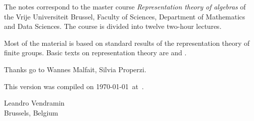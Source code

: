 \preface

The notes correspond to the master  
course \emph{Representation theory of algebras} of the 
Vrije Universiteit Brussel, 
Faculty of Sciences, 
Department of Mathematics and Data Sciences. The course
is divided into twelve two-hour lectures. 

Most of the material is based on standard 
results of the representation theory of finite groups. 
Basic texts on representation theory are \cite{MR1369573} 
and \cite{MR2270898}. 

Thanks go to Wannes Malfait, Silvia Properzi.  

This version 
was compiled on \today~at~\currenttime.

\bigskip
\begin{flushright}
Leandro Vendramin\\Brussels, Belgium\par
\end{flushright}
